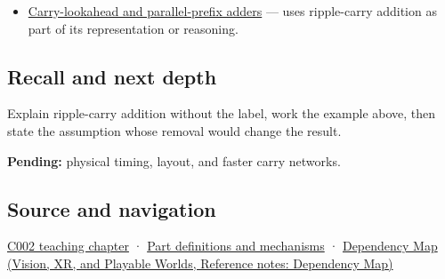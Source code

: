 \hypertarget{appendix-17917d9fdbe3-used-by}{}

\begin{itemize}
\tightlist
\item
  \hyperref[appendix-b5c46b2d94ff]{Carry-lookahead and parallel-prefix adders} --- uses ripple-carry addition as part of its representation or reasoning.
\end{itemize}

\subsection{Recall and next depth}\label{appendix-17917d9fdbe3-recall-and-next-depth}

\hypertarget{appendix-17917d9fdbe3-recall-and-next-depth}{}

Explain ripple-carry addition without the label, work the example above, then state the assumption whose removal would change the result.

\textbf{Pending:} physical timing, layout, and faster carry networks.

\subsection{Source and navigation}\label{appendix-17917d9fdbe3-source-and-navigation}

\hypertarget{appendix-17917d9fdbe3-source-and-navigation}{}

\hyperref[01-foundations-i-ch001-arithmetic-becomes-a-policy]{C002 teaching chapter} · \hyperref[appendix-fd090d982a15]{Part definitions and mechanisms} · \href{../07-Vision-XR-and-Playable-Worlds/main.pdf\#nameddest=appendix-4ad47bdd269a}{Dependency Map (Vision, XR, and Playable Worlds, Reference notes: Dependency Map)}
